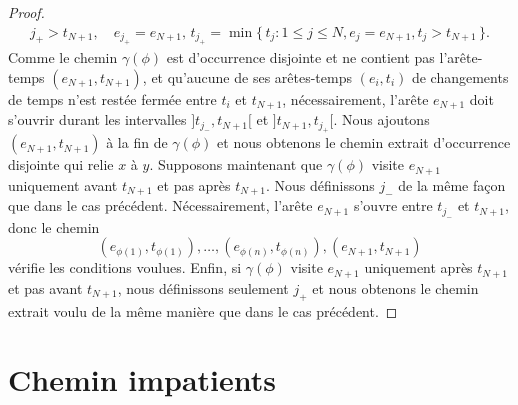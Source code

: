 \documentclass[titlepage,a4paper,12pt]{article}
\newcounter{d}
\newcounter{t}
\newcounter{p}
\newcounter{c}
\newcounter{a}
\newcounter{l}
\begin{document}
\begin{proof}
\begin{align*}
{j_+}> t_{N+1},\quad e_{j_+} = e_{N+1},\, t_{j_+} = \min \big\{\,t_j:1\leqslant j \leqslant N, e_j = e_{N+1}, t_j > t_{N+1}\,\big\}.
\end{align*}
Comme le chemin $\gamma(\phi)$ est d'occurrence disjointe et ne contient pas l'arête-temps $(e_{N+1},t_{N+1})$, et qu'aucune de ses arêtes-temps $(e_i,t_i)$ de changements de temps n'est restée fermée entre $t_i$ et $t_{N+1}$, nécessairement, l'arête $e_{N+1}$ doit s'ouvrir durant les intervalles $]t_{j_-},t_{N+1}[$ et $]t_{N+1},t_{j_+}[$. Nous ajoutons $(e_{N+1},t_{N+1})$ à la fin de $\gamma(\phi)$ et nous obtenons le chemin extrait d'occurrence disjointe qui relie $x$ à $y$. Supposons maintenant que $\gamma(\phi)$ visite $e_{N+1}$ uniquement avant $t_{N+1}$ et pas après $t_{N+1}$. Nous définissons $j_-$ de la même façon que dans le cas précédent. Nécessairement, l'arête $e_{N+1}$ s'ouvre entre $t_{j_-}$ et $t_{N+1}$, donc le chemin $$(e_{\phi(1)},t_{\phi(1)}),\dots, (e_{\phi(n)},t_{\phi(n)}),(e_{N+1},t_{N+1})$$ vérifie les conditions voulues. Enfin, si $\gamma(\phi)$ visite $e_{N+1}$ uniquement après $t_{N+1}$ et pas avant $t_{N+1}$, nous définissons seulement $j_+$ et nous obtenons le chemin extrait voulu de la même manière que dans le cas précédent.
\end{proof}

\section{Chemin impatients}
\end{document}

